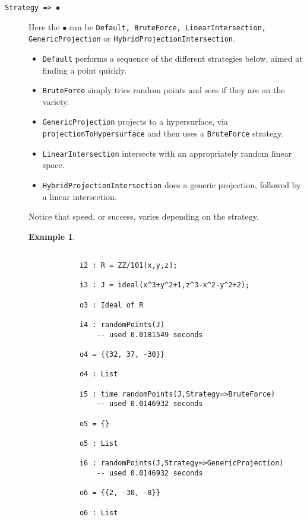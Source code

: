 \documentclass[11pt]{amsart}
\theoremstyle{definition}
\newtheorem{example}{Example}[section]
\begin{document}
\begin{description}		
	\item[\tt Strategy => $\bullet$]   Here the $\bullet$ can be {\tt Default, BruteForce, LinearIntersection, GenericProjection} or {\tt HybridProjectionIntersection}.

	\begin{itemize}
		\item {\tt Default} performs a sequence of the different strategies below, aimed at finding a point quickly.    
		\item {\tt BruteForce} simply tries random points and sees if they are on the variety.
		
		\item {\tt GenericProjection} projects to a hypersurface, via 
		{\tt projectionToHypersurface} and then uses a {\tt BruteForce} strategy.
		
		\item {\tt LinearIntersection} intersects with an appropriately random linear space.
		
		\item {\tt HybridProjectionIntersection} does a generic projection, followed by a linear intersection. 		
	\end{itemize}

	Notice that speed, or success, varies depending on the strategy.

	\begin{example}\label{BruteForce}
		{{\small\color{blue}
		\begin{verbatim}

			i2 : R = ZZ/101[x,y,z];
			
			i3 : J = ideal(x^3+y^2+1,z^3-x^2-y^2+2);
			
			o3 : Ideal of R
			
			i4 : randomPoints(J)
				-- used 0.0181549 seconds

			o4 = {{32, 37, -30}}
			
			o4 : List
			
			i5 : time randomPoints(J,Strategy=>BruteForce)
				-- used 0.0146932 seconds

			o5 = {}
			
			o5 : List
			
			i6 : randomPoints(J,Strategy=>GenericProjection)
				-- used 0.0146932 seconds

			o6 = {{2, -30, -8}}
			
			o6 : List
			
	\end{verbatim}
	}}
	\end{example}
		

\end{description}
\end{document}
